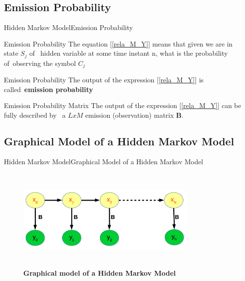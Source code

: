 \documentclass[10pt]{beamer}
\begin{document}
\subsection{Emission Probability}
\begin{frame}{Hidden Markov Model}{Emission Probability}
   \begin{block}{Emission Probability}
        The equation [\ref{rela_M_Y}] means that given we are in state $S_j$ of \
        hidden variable at some time instant n, what is the probability of\ 
        observing the symbol $C_j$
   \end{block}
   \begin{block}{Emission Probability}
        The output of the expression [\ref{rela_M_Y}] is called\
        \textbf{emission probability}
   \end{block}
   \begin{block}{Emission Probability Matrix}
        The output of the expression [\ref{rela_M_Y}] can be fully described by \
        a $LxM$ emission (observation) matrix \textbf{B}.
   \end{block}
\end{frame}

\subsection{Graphical Model of a Hidden Markov Model}
\begin{frame}{Hidden Markov Model}{Graphical Model of a Hidden Markov Model}
  \begin{figure}[h]
    \centering
    \includegraphics[width=3.5in,height=2in]{figures/graphical_model_hidden_markov_model.png}
    \caption {\textbf{Graphical model of a Hidden Markov Model}}
  \end{figure}
\end{frame}
\end{document}

